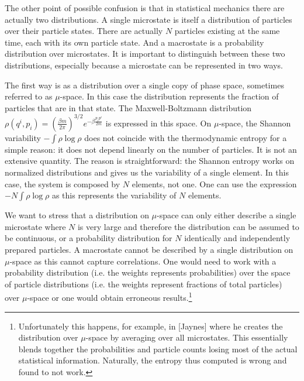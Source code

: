 \documentclass{article}
\begin{document}
The other point of possible confusion is that in statistical mechanics there are actually two distributions. A single microstate is itself a distribution of particles over their particle states. There are actually $N$ particles existing at the same time, each with its own particle state. And a macrostate is a probability distribution over microstates. It is important to distinguish between these two distributions, especially because a microstate can be represented in two ways.

The first way is as a distribution over a single copy of phase space, sometimes referred to as $\mu$-space. In this case the distribution represents the fraction of particles that are in that state. The Maxwell-Boltzmann distribution $\rho(q^i, p_i) = \left(\frac{\beta m}{2\pi} \right)^{3/2}e^{-\beta \frac{p_ip^i}{2m}}$ is expressed in this space. On $\mu$-space, the Shannon variability $-\int\rho \log \rho$ does not coincide with the thermodynamic entropy for a simple reason: it does not depend linearly on the number of particles. It is not an extensive quantity. The reason is straightforward: the Shannon entropy works on normalized distributions and gives us the variability of a single element. In this case, the system is composed by $N$ elements, not one. One can use the expression $-N\int\rho \log \rho$ as this represents the variability of $N$ elements.

We want to stress that a distribution on $\mu$-space can only either describe a single microstate where $N$ is very large and therefore the distribution can be assumed to be continuous, or a probability distribution for $N$ identically and independently prepared particles. A macrostate cannot be described by a single distribution on $\mu$-space as this cannot capture correlations. One would need to work with a probability distribution (i.e. the weights represents probabilities) over the space of particle distributions (i.e. the weights represent fractions of total particles) over $\mu$-space or one would obtain erroneous results.\footnote{Unfortunately this happens, for example, in [Jaynes] where he creates the distribution over $\mu$-space by averaging over all microstates. This essentially blends together the probabilities and particle counts losing most of the actual statistical information. Naturally, the entropy thus computed is wrong and found to not work.}
\end{document}
